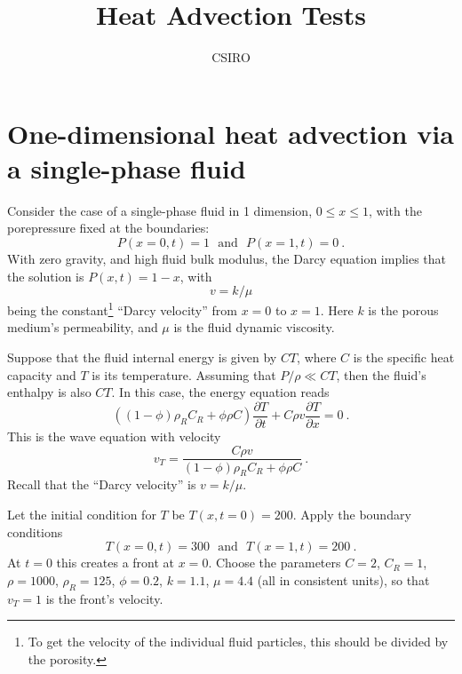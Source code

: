 \documentclass[]{scrreprt}
\begin{document}
\title{Heat Advection Tests}
\author{CSIRO}
\maketitle

\tableofcontents

\chapter{One-dimensional heat advection via a single-phase fluid}

Consider the case of a single-phase fluid in 1 dimension, $0\leq x
\leq 1$, with the porepressure fixed at the boundaries:
\begin{equation}
P(x=0, t) = 1 \ \ \ \mbox{and}\ \ \ P(x=1, t) = 0 \ .
\end{equation}
With zero gravity, and high fluid bulk modulus, the Darcy equation
implies that the solution is $P(x, t) = 1 - x$, with
\begin{equation}
v = k/\mu
\end{equation}
being the constant\footnote{To get the velocity of the individual
  fluid particles, this should be divided by the porosity.} ``Darcy
velocity'' from $x=0$ to $x=1$.  Here $k$ is the porous medium's
permeability, and $\mu$ is the fluid dynamic viscosity.

Suppose that the fluid internal energy is given by $CT$, where $C$ is
the specific heat capacity and $T$ is its temperature.  Assuming that
$P/\rho \ll CT$, then the fluid's enthalpy is also $CT$.  In this
case, the energy equation reads
\begin{equation}
\left((1 - \phi)\rho_{R}C_{R} + \phi\rho C \right) \frac{\partial
  T}{\partial t} + C \rho v \frac{\partial T}{\partial x} = 0 \ .
\end{equation}
This is the wave equation with velocity
\begin{equation}
v_{T} = \frac{C\rho v}{(1 - \phi)\rho_{R}C_{R} + \phi\rho C} \ .
\end{equation}
Recall that the ``Darcy velocity'' is $v=k/\mu$.

Let the initial condition for $T$ be $T(x, t=0) = 200$.  Apply the
boundary conditions
\begin{equation}
T(x=0, t) = 300 \ \ \ \mbox{and} \ \ \ T(x=1, t) = 200 \ .
\end{equation}
At $t=0$ this creates a front at $x=0$.  Choose the parameters $C=2$,
$C_{R}=1$, $\rho=1000$, $\rho_{R}=125$, $\phi=0.2$, $k=1.1$, $\mu=4.4$
(all in consistent units), so that $v_{T}=1$ is the front's velocity.
\end{document}
